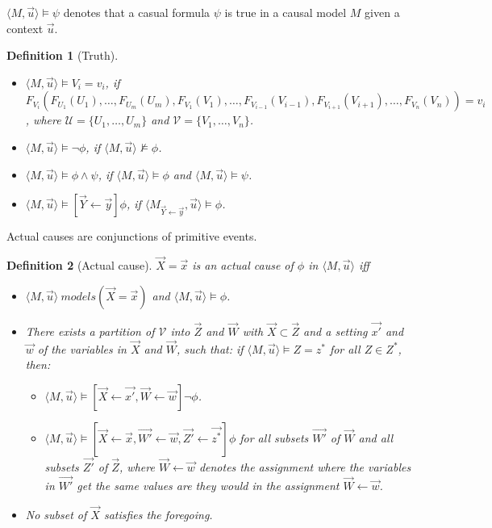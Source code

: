\documentclass{iosart2c}
\newcommand{\assignment}[2]{#1 \leftarrow #2}
\newcommand{\pair}[2]{\langle#1,#2\rangle}
\newcommand{\range}[2]{#1,\ldots,#2}
\newcommand{\set}[1]{\{#1\}}
\newtheorem{definition}{Definition}
\begin{document}
$\pair{M}{\vec{u}} \models \psi$ denotes that a casual formula $\psi$ is true in a causal model $M$ given a context $\vec{u}$.

\begin{definition}[Truth]
\begin{itemize}
\item $\pair{M}{\vec{u}} \models V_i = v_i$, if $F_{V_i}(F_{U_1}(U_1), \ldots, F_{U_m}(U_m), F_{V_1}(V_1), \ldots, F_{V_{i-1}}(V_{i-1}), F_{V_{i+1}}(V_{i+1}), \ldots, F_{V_n}(V_n)) = v_i$, where $\mathcal{U} = \set{\range{U_1}{U_m}}$ and $\mathcal{V} = \set{\range{V_1}{V_n}}$.
\item $\pair{M}{\vec{u}} \models \lnot \phi$, if $\pair{M}{\vec{u}} \not\models \phi$.
\item $\pair{M}{\vec{u}} \models \phi \land \psi$, if $\pair{M}{\vec{u}} \models \phi$ and $\pair{M}{\vec{u}} \models \psi$.
\item $\pair{M}{\vec{u}} \models [\assignment{\vec{Y}}{\vec{y}}]\phi$, if $\pair{M_{\assignment{\vec{Y}}{\vec{y}}}}{\vec{u}} \models \phi$.
\end{itemize}
\end{definition}

Actual causes are conjunctions of primitive events.

\begin{definition}[Actual cause]
\label{def:actual_cause}
$\vec{X} = \vec{x}$ is an actual cause of $\phi$ in $\pair{M}{\vec{u}}$ iff
\begin{itemize}
\item $\pair{M}{\vec{u}} \ models (\vec{X} = \vec{x})$ and $\pair{M}{\vec{u}} \models \phi$.
\item There exists a partition of $\mathcal{V}$ into $\vec{Z}$ and $\vec{W}$ with $\vec{X} \subset \vec{Z}$ and a setting $\vec{x'}$ and $\vec{w}$ of the variables in $\vec{X}$ and $\vec{W}$, such that: if $\pair{M}{\vec{u}} \models Z = z^*$ for all $Z \in Z^*$, then:
  \begin{itemize}
  \item $\pair{M}{\vec{u}} \models [\assignment{\vec{X}}{\vec{x'}}, \assignment{\vec{W}}{\vec{w}}] \lnot \phi$.
  \item $\pair{M}{\vec{u}} \models [\assignment{\vec{X}}{\vec{x}}, \assignment{\vec{W'}}{\vec{w}}, \assignment{\vec{Z'}}{\vec{z^*}}] \phi$ for all subsets $\vec{W'}$ of $\vec{W}$ and all subsets $\vec{Z'}$ of $\vec{Z}$, where $\assignment{\vec{W}}{\vec{w}}$ denotes the assignment where the variables in $\vec{W'}$ get the same values are they would in the assignment $\assignment{\vec{W}}{\vec{w}}$.
  \end{itemize}
\item No subset of $\vec{X}$ satisfies the foregoing.
\end{itemize}
\end{definition}



\end{document}
